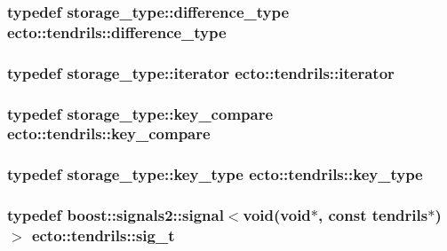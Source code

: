 \subsubsection[{difference\+\_\+type}]{\setlength{\rightskip}{0pt plus 5cm}typedef storage\+\_\+type\+::difference\+\_\+type {\bf ecto\+::tendrils\+::difference\+\_\+type}}\label{classecto_1_1tendrils_a919b9a4666ad641148b6a432a1fd08fb}
\hypertarget{classecto_1_1tendrils_a6f0b7bd6e3a03f047351303630b889e0}{}
\subsubsection[{iterator}]{\setlength{\rightskip}{0pt plus 5cm}typedef storage\+\_\+type\+::iterator {\bf ecto\+::tendrils\+::iterator}}\label{classecto_1_1tendrils_a6f0b7bd6e3a03f047351303630b889e0}
\hypertarget{classecto_1_1tendrils_aa347bebda44153437e8554a25bed9e6b}{}
\subsubsection[{key\+\_\+compare}]{\setlength{\rightskip}{0pt plus 5cm}typedef storage\+\_\+type\+::key\+\_\+compare {\bf ecto\+::tendrils\+::key\+\_\+compare}}\label{classecto_1_1tendrils_aa347bebda44153437e8554a25bed9e6b}
\hypertarget{classecto_1_1tendrils_aa6165c6ab72d93cd56796ea81e450245}{}
\subsubsection[{key\+\_\+type}]{\setlength{\rightskip}{0pt plus 5cm}typedef storage\+\_\+type\+::key\+\_\+type {\bf ecto\+::tendrils\+::key\+\_\+type}}\label{classecto_1_1tendrils_aa6165c6ab72d93cd56796ea81e450245}
\hypertarget{classecto_1_1tendrils_aca7990b4d8ccfbddfb4d5c805345ca23}{}
\subsubsection[{sig\+\_\+t}]{\setlength{\rightskip}{0pt plus 5cm}typedef boost\+::signals2\+::signal$<$void(void$\ast$, const {\bf tendrils}$\ast$)$>$ {\bf ecto\+::tendrils\+::sig\+\_\+t}\hspace{0.3cm}{\ttfamily [private]}}\label{classecto_1_1tendrils_aca7990b4d8ccfbddfb4d5c805345ca23}
\hypertarget{classecto_1_1tendrils_af3726f822a4fd60a1095bba31f1926ef}{}
